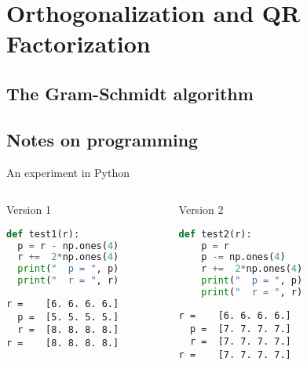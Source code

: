 \section{Orthogonalization and QR Factorization}
\frame{\sectoc}

\subsection{The Gram-Schmidt algorithm}
\frame{\subtoc}



\subsection{Notes on programming}
\frame{\subtoc}

\begin{frame}[fragile]{An experiment in Python}
  \begin{columns}
    \begin{column}[t]{.49\textwidth}
      \begin{block}{Version 1}\small
        \begin{lstlisting}[language=Python]
def test1(r):
  p = r - np.ones(4)
  r +=  2*np.ones(4)
  print("  p = ", p)
  print("  r = ", r)
        \end{lstlisting}
      \end{block}
\begin{verbatim}
r =    [6. 6. 6. 6.]
  p =  [5. 5. 5. 5.]
  r =  [8. 8. 8. 8.]
r =    [8. 8. 8. 8.]
\end{verbatim}
    \end{column}
    \begin{column}[t]{.49\textwidth}
      \begin{block}{Version 2}
        \begin{lstlisting}[language=Python]
def test2(r):
    p = r
    p -= np.ones(4)
    r +=  2*np.ones(4)
    print("  p = ", p)
    print("  r = ", r)          
        \end{lstlisting}        
      \end{block}
\begin{verbatim}
r =    [6. 6. 6. 6.]
  p =  [7. 7. 7. 7.]
  r =  [7. 7. 7. 7.]
r =    [7. 7. 7. 7.]
\end{verbatim}
    \end{column}
  \end{columns}
\end{frame}

